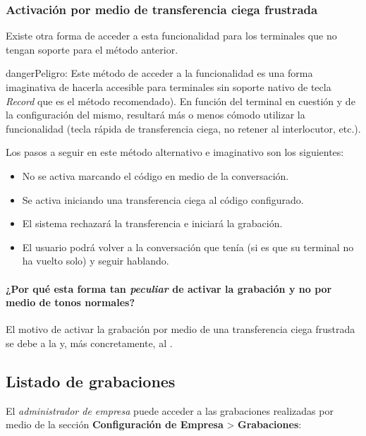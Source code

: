 \documentclass[letterpaper,10pt,spanish]{sphinxmanual}
\begin{document}
\subsubsection{Activación por medio de transferencia ciega frustrada}
\label{pbx_features/call_recording:activated-using-a-frustated-blind-transfer}
Existe otra forma de acceder a esta funcionalidad para los terminales que no tengan soporte para el método anterior.

\begin{notice}{danger}{Peligro:}
Este método de acceder a la funcionalidad es una forma imaginativa de hacerla accesible para terminales sin soporte nativo de tecla \emph{Record} que es el método recomendado). En función del terminal en cuestión y de la configuración del mismo, resultará más o menos cómodo utilizar la funcionalidad (tecla rápida de transferencia ciega, no retener al interlocutor, etc.).
\end{notice}

Los pasos a seguir en este método alternativo e imaginativo son los siguientes:
\begin{itemize}
\item {} 
No se activa marcando el código en medio de la conversación.

\item {} 
Se activa iniciando una transferencia ciega al código configurado.

\item {} 
El sistema rechazará la transferencia e iniciará la grabación.

\item {} 
El usuario podrá volver a la conversación que tenía (si es que su terminal no ha vuelto solo) y seguir hablando.

\end{itemize}
\paragraph{¿Por qué esta forma tan \emph{peculiar} de activar la grabación y no por medio de tonos normales?}

El motivo de activar la grabación por medio de una transferencia ciega frustrada se debe a la {\hyperref[architecture/index:architecture]{}} y, más concretamente, al {\hyperref[architecture/index:audioflow]{}}.


\subsection{Listado de grabaciones}
\label{pbx_features/call_recording:recordings-list}
El \emph{administrador de empresa} puede acceder a las grabaciones realizadas por medio de la sección \textbf{Configuración de Empresa} \textgreater{} \textbf{Grabaciones}:
\end{document}
